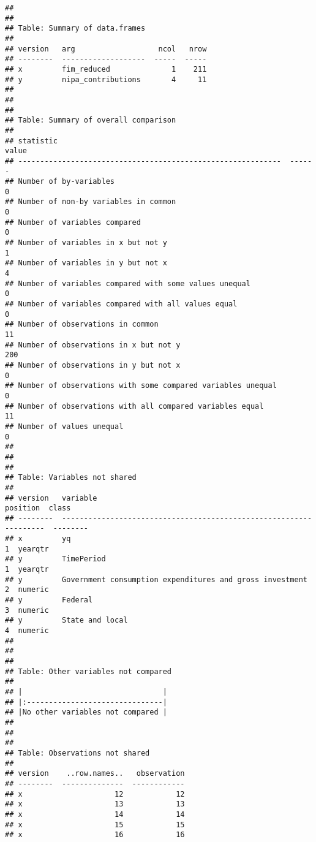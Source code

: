 \documentclass[
]{article}
\begin{document}
\begin{verbatim}
## 
## 
## Table: Summary of data.frames
## 
## version   arg                   ncol   nrow
## --------  -------------------  -----  -----
## x         fim_reduced              1    211
## y         nipa_contributions       4     11
## 
## 
## 
## Table: Summary of overall comparison
## 
## statistic                                                      value
## ------------------------------------------------------------  ------
## Number of by-variables                                             0
## Number of non-by variables in common                               0
## Number of variables compared                                       0
## Number of variables in x but not y                                 1
## Number of variables in y but not x                                 4
## Number of variables compared with some values unequal              0
## Number of variables compared with all values equal                 0
## Number of observations in common                                  11
## Number of observations in x but not y                            200
## Number of observations in y but not x                              0
## Number of observations with some compared variables unequal        0
## Number of observations with all compared variables equal          11
## Number of values unequal                                           0
## 
## 
## 
## Table: Variables not shared
## 
## version   variable                                                    position  class   
## --------  ---------------------------------------------------------  ---------  --------
## x         yq                                                                 1  yearqtr 
## y         TimePeriod                                                         1  yearqtr 
## y         Government consumption expenditures and gross investment           2  numeric 
## y         Federal                                                            3  numeric 
## y         State and local                                                    4  numeric 
## 
## 
## 
## Table: Other variables not compared
## 
## |                                |
## |:-------------------------------|
## |No other variables not compared |
## 
## 
## 
## Table: Observations not shared
## 
## version    ..row.names..   observation
## --------  --------------  ------------
## x                     12            12
## x                     13            13
## x                     14            14
## x                     15            15
## x                     16            16

\end{verbatim}
\end{document}
